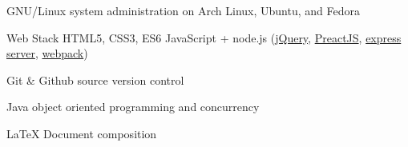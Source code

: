 

\begin{cvskills}

  \cvskill
    {GNU/Linux} %
    {system administration on Arch Linux, Ubuntu, and Fedora} %

  \cvskill
    {Web Stack} %
    {HTML5, CSS3, ES6 JavaScript + node.js (\href{https://jquery.com/}{jQuery}, 
    \href{https://preactjs.com/}{PreactJS},
    \href{https://expressjs.com/}{express server},
    \href{https://webpack.js.org/}{webpack})
} %

  \cvskill
    {Git \& Github} %
    {source version control} %

  \cvskill
    {Java} %
    {object oriented programming and concurrency} %

  \cvskill
    {LaTeX} %
    {Document composition} %

\end{cvskills}
